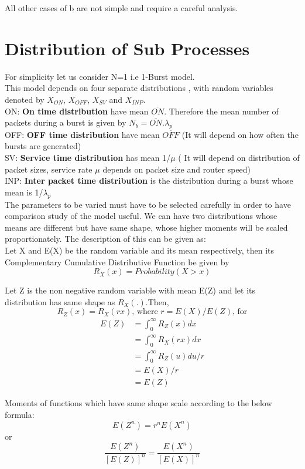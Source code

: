 All other cases of b are not simple and require a careful analysis.\\

\section{Distribution of Sub Processes}

For simplicity let us consider N=1 i.e 1-Burst model.\\
This model depends on four separate distributions , with random variables denoted by $X_{ON}$, $X_{OFF}$, $X_{SV}$ and $X_{INP}$.\\
ON: \textbf{On time distribution} have mean $\overline{ON}$. Therefore the mean number of packets during a burst is given by $N_{b} =  \overline{ON}.\lambda_{p}$  \\
OFF: \textbf{OFF time distribution} have mean $\overline{OFF}$ (It will depend on how often the bursts are generated) \\
SV: \textbf{Service time distribution} has mean 1/$\mu$ ( It will depend on distribution of packet sizes, service rate $\mu$ depends on packet size and router speed)\\
INP: \textbf{Inter packet time distribution} is the distribution during a burst whose mean is 1/$\lambda_{p}$ \\

The parameters to be varied must have to be selected carefully in order to have comparison study of the model useful. We can have two distributions whose means are different but have same shape, whose higher moments will be scaled proportionately. The description of this can be given as:\\
Let X and E(X) be the random variable and its mean respectively, then its Complementary Cumulative Distributive Function be given by\\
\begin{equation}
	R_X{(x)} = Probability(X > x)
\end{equation}

Let Z is the non negative random variable with mean E(Z) and let its distribution has same shape as $R_X(.)$.Then, \\
\[R_Z{(x)} = R_X{(rx)}\text{, where }  r = E(X)/E(Z)\text{, for}\]
\begin{align*}
 E(Z) &=\int_{0}^{\infty} R_Z{(x)} dx\\
 &= \int_{0}^{\infty} R_X{(rx)} dx\\
 &= \int_{0}^{\infty} R_Z{(u)} du/r\\
 &= E(X)/r\\
 &= E(Z) 
\end{align*}
\begin{remark}
Moments of functions which have same shape scale according to the below formula:
\begin{equation}
E(Z^n) = r^nE(X^n)
\end{equation}
or
\begin{equation}
\frac{E(Z^n)}{[E(Z)]^n} = \frac{E(X^n)}{[E(X)]^n}
\end{equation}
\end{remark}

